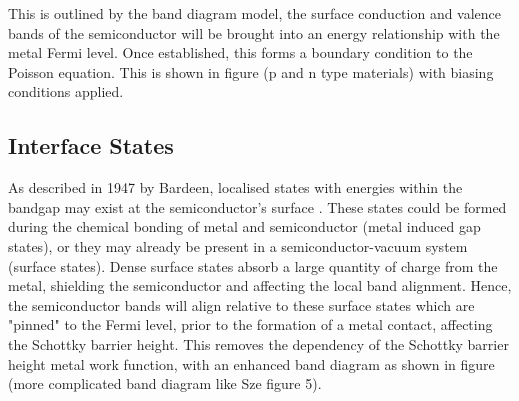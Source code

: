 This is outlined by the band diagram model, the surface conduction and valence bands of the semiconductor will be brought into an energy relationship with the metal Fermi level. Once established, this forms a boundary condition to the Poisson equation. This is shown in figure (p and n type materials) with biasing conditions applied. 

\subsection{Interface States}
As described in 1947 by Bardeen, localised states with energies within the bandgap may exist at the semiconductor's surface \cite{bardeen:1947}. These states could be formed during the chemical bonding of metal and semiconductor (metal induced gap states), or they may already be present in a semiconductor-vacuum system (surface states). Dense surface states absorb a large quantity of charge from the metal, shielding the semiconductor and affecting the local band alignment. Hence, the semiconductor bands will align relative to these surface states which are "pinned" to the Fermi level, prior to the formation of a metal contact, affecting the Schottky barrier height. This removes the dependency of the Schottky barrier height metal work function, with an enhanced band diagram as shown in figure (more complicated band diagram like Sze figure 5).

